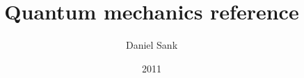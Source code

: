 \documentclass[english,aps]{revtex4}
\begin{document}
\author{Daniel Sank} 
\title{Quantum mechanics reference}
\date{2011}

\maketitle







\end{document}
